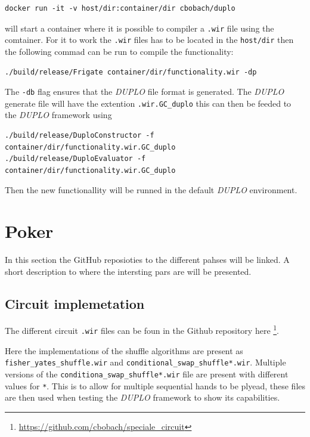 \documentclass[twoside,11pt,openright]{report}
\newcommand{\DUPLO}{\textit{DUPLO} }
\begin{document}
\begin{appendices}
\begin{center}
\begin{verbatim}
docker run -it -v host/dir:container/dir cbobach/duplo
\end{verbatim}
\end{center}

will start a container where it is possible to compiler a \verb|.wir| file using the comtainer. For it to work the \verb|.wir| files has to be located in the \verb|host/dir| then the following commad can be run to compile the functionality:

\begin{center}
\begin{verbatim}
./build/release/Frigate container/dir/functionality.wir -dp
\end{verbatim}
\end{center}

The \verb|-db| flag ensures that the \DUPLO file format is generated. The \DUPLO generate file will have the extention \verb|.wir.GC_duplo| this can then be feeded to the \DUPLO framework using

\begin{center}
\begin{verbatim}
./build/release/DuploConstructor -f container/dir/functionality.wir.GC_duplo
./build/release/DuploEvaluator -f container/dir/functionality.wir.GC_duplo
\end{verbatim}
\end{center}

Then the new functionallity will be runned in the default \DUPLO environment.

\section{Poker}
\label{app:poker}
In this section the GitHub reposioties to the different pahses will be linked. A short description to where the intersting pars are will be presented.

\subsection{Circuit implemetation}
\label{app:circuit-impl}
The different circuit \verb|.wir| files can be foun in the Github repository here \footnote{\url{https://github.com/cbobach/speciale_circuit}}.

Here the implementations of the shuffle algorithms are present as \verb|fisher_yates_shuffle.wir| and \verb|conditional_swap_shuffle*.wir|. Multiple versions of the \verb|conditiona_swap_shuffle*.wir| file are present with different values for \verb|*|. This is to allow for multiple sequential hands to be plyead, these files are then used when testing the \DUPLO framework to show its capabilities.


\end{appendices}
\end{document}
